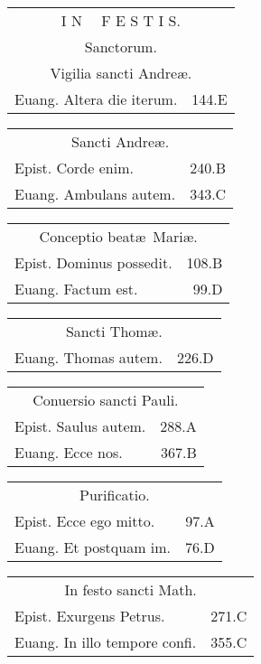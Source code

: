 \documentclass[a5paper,10pt]{book}
\def\ae{æ}
\begin{document}
\begin{multicols}{2}
\begin{tabular}{l r}
\end{tabular}
\begin{tabular}{l r}
\multicolumn{2}{c}{\color{red} \large I N \ \ F E S T I S.}\\
\multicolumn{2}{c}{\color{red} Sanctorum.}\\
\multicolumn{2}{c}{\color{red} Vigilia sancti Andre\ae .}\\
Euang. Altera die iterum. & 144.E\\
\end{tabular}
\begin{tabular}{l r}
\multicolumn{2}{c}{\color{red} Sancti Andre\ae .}\\
Epist. Corde enim. & 240.B\\
Euang. Ambulans autem. & 343.C\\
\end{tabular}
\begin{tabular}{l r}
\multicolumn{2}{c}{\color{red} Conceptio beat\ae \ Mari\ae .}\\
Epist. Dominus possedit. & 108.B\\
Euang. Factum est. & 99.D\\
\end{tabular}
\begin{tabular}{l r}
\multicolumn{2}{c}{\color{red} Sancti Thom\ae .}\\
Euang. Thomas autem. & 226.D\\
\end{tabular}
\begin{tabular}{l r}
\multicolumn{2}{c}{\color{red} Conuersio sancti Pauli.}\\
Epist. Saulus autem. & 288.A\\
Euang. Ecce nos. & 367.B\\
\end{tabular}
\begin{tabular}{l r}
\multicolumn{2}{c}{\color{red} Purificatio.}\\
Epist. Ecce ego mitto. & 97.A\\
Euang. Et postquam im. & 76.D\\
\end{tabular}
\begin{tabular}{l r}
\multicolumn{2}{c}{\color{red} In festo sancti Math.}\\
Epist. Exurgens Petrus. & 271.C\\
Euang. In illo tempore confi. & 355.C\\
\end{tabular}
\begin{tabular}{l r}

\end{tabular}
\end{multicols}
\end{document}
